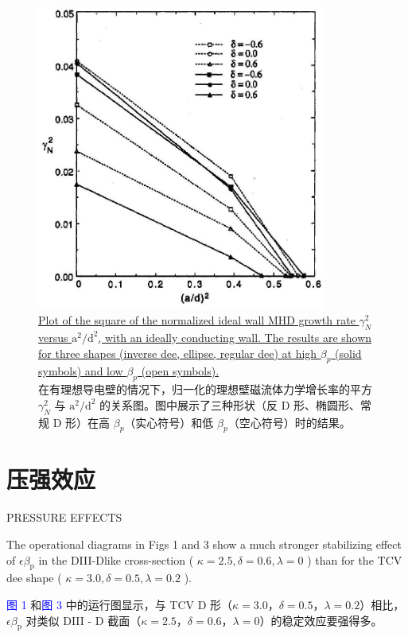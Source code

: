 \documentclass[utf8]{ctexart}
\newcommand\enzhbox[2]{
  	\quad\par \begin{paracol}{2} \colseprulecolor{black} 
  		\begin{spacing}{1.0}
  			\footnotesize  #1
  		\end{spacing}
  		\switchcolumn[1] 
  		#2
  	\end{paracol} \quad\par
  }
\begin{document}
\begin{sloppypar}
   \begin{figure}[H]
  	\centering
  	\includegraphics[max width=0.85\textwidth,max height=0.3\textheight]{2025_01_10_a0135324997886412d98g-6(1)}
 \caption{\uline{Plot of the square of the normalized ideal wall MHD growth rate $\gamma_{N}^{2}$ versus $\mathrm{a}^{2} / \mathrm{d}^{2}$, with an ideally conducting wall. The results are shown for three shapes (inverse dee, ellipse, regular dee) at high $\beta_{p}$ (solid symbols) and low $\beta_{p}$ (open symbols).}\\在有理想导电壁的情况下，归一化的理想壁磁流体力学增长率的平方 $\gamma_{N}^{2}$ 与 $\mathrm{a}^{2} / \mathrm{d}^{2}$ 的关系图。图中展示了三种形状（反 D 形、椭圆形、常规 D 形）在高 $\beta_{p}$（实心符号）和低 $\beta_{p}$（空心符号）时的结果。 }
  	\label{fig}
  \end{figure}
 
  
 \section{压强效应}
 {  \small PRESSURE EFFECTS \par }
  
 
\enzhbox{  The operational diagrams in Figs 1 and 3 show a much stronger stabilizing effect of $\epsilon \beta_{\mathrm{p}}$ in the DIII-Dlike cross-section ( $\kappa=2.5, \delta=0.6, \lambda=0$ ) than for the TCV dee shape ( $\kappa=3.0, \delta=0.5, \lambda=0.2$ ).}{
\textcolor{blue}{图 1} 和\textcolor{blue}{图 3} 中的运行图显示，与 TCV D 形（$\kappa = 3.0$，$\delta = 0.5$，$\lambda = 0.2$）相比，$\epsilon \beta_{\mathrm{p}}$ 对类似 DIII - D 截面（$\kappa = 2.5$，$\delta = 0.6$，$\lambda = 0$）的稳定效应要强得多。 }
  

\end{sloppypar}
\end{document}
